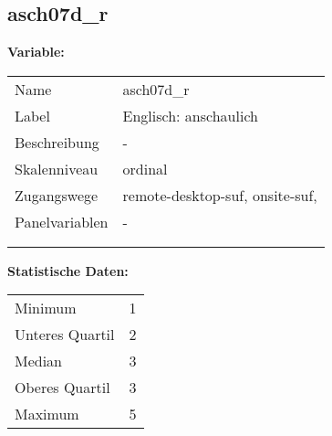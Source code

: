 	
	
	\subsection{asch07d\_r}
	\label{subSection:asch07d_r}

	\noindent\textbf{Variable:}\\
		\begin{tabular}{lL{11.3cm}}
			\label{tableVariable:asch07d_r}
			Name & asch07d\_r \\
			Label & Englisch: anschaulich \\
			Beschreibung & - \\
			Skalenniveau & ordinal \\
			Zugangswege &
				remote-desktop-suf,
				onsite-suf,
 \\
			Panelvariablen & -
			 \\
			 \\
 \\
		\end{tabular}



		\vspace*{1 cm}
		\noindent\textbf{Statistische Daten:}\\
			\begin{tabular}{ll}
				\label{tableStatistics:asch07d_r}
					Minimum & 1 \\
					Unteres Quartil & 2 \\
					Median & 3 \\
					Oberes Quartil & 3 \\
					Maximum & 5 \\
			\end{tabular}



